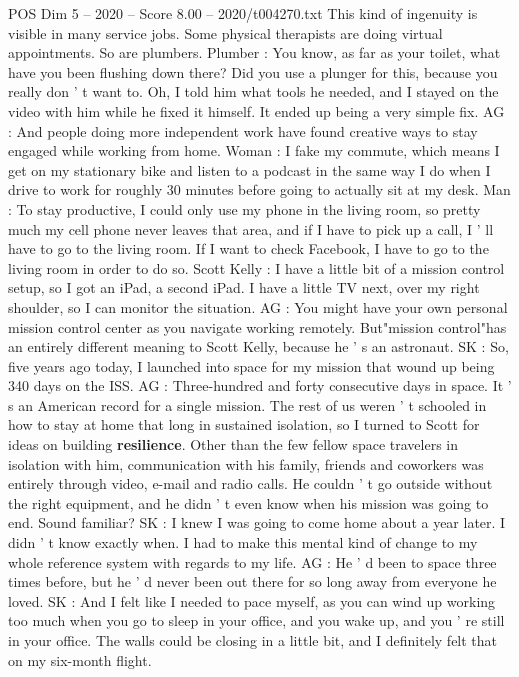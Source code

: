 \begin{textsample}{POS Dim 5 – 2020 – Score 8.00 – 2020/t004270.txt}
This kind of ingenuity is visible in many service jobs.
Some physical therapists are doing virtual appointments.
So are plumbers.
Plumber : You know, as far as your toilet, what have you been flushing down there?
Did you use a plunger for this, because you really don ' t want to.
Oh, I told him what tools he needed, and I stayed on the video with him while he fixed it himself.
It ended up being a very simple fix.
AG : And people doing more independent work have found creative ways to stay engaged while working from home.
Woman : I fake my commute, which means I get on my stationary bike and listen to a podcast in the same way I do when I drive to work for roughly 30 minutes before going to actually sit at my desk.
Man : To stay productive, I could only use my phone in the living room, so pretty much my cell phone never leaves that area, and if I have to pick up a call, I ' ll have to go to the living room.
If I want to check Facebook, I have to go to the living room in order to do so.
Scott Kelly : I have a little bit of a mission control setup, so I got an iPad, a second iPad.
I have a little TV next, over my right shoulder, so I can monitor the situation.
AG : You might have your own personal mission control center as you navigate working remotely.
But"mission control"has an entirely different meaning to Scott Kelly, because he ' s an astronaut.
SK : So, five years ago today, I launched into space for my mission that wound up being 340 days on the ISS.
AG : Three-hundred and forty consecutive days in space.
It ' s an American record for a single mission.
The rest of us weren ' t schooled in how to stay at home that long in sustained isolation, so I turned to Scott for ideas on building \textbf{resilience}.
Other than the few fellow space travelers in isolation with him, communication with his family, friends and coworkers was entirely through video, e-mail and radio calls.
He couldn ' t go outside without the right equipment, and he didn ' t even know when his mission was going to end.
Sound familiar?
SK : I knew I was going to come home about a year later.
I didn ' t know exactly when.
I had to make this mental kind of change to my whole reference system with regards to my life.
AG : He ' d been to space three times before, but he ' d never been out there for so long away from everyone he loved.
SK : And I felt like I needed to pace myself, as you can wind up working too much when you go to sleep in your office, and you wake up, and you ' re still in your office.
The walls could be closing in a little bit, and I definitely felt that on my six-month flight.

\end{textsample}
